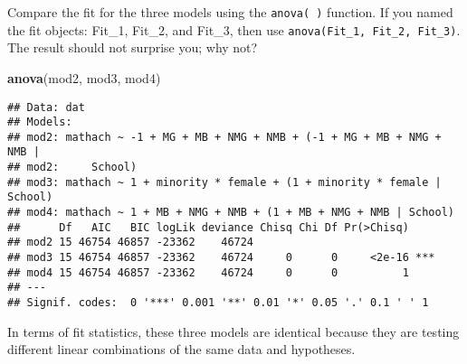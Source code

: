 \documentclass[]{article}
\newenvironment{Shaded}{\begin{snugshade}}{\end{snugshade}}
\newcommand{\KeywordTok}[1]{\textcolor[rgb]{0.13,0.29,0.53}{\textbf{#1}}}
\newcommand{\NormalTok}[1]{#1}
\begin{document}
Compare the fit for the three models using the \texttt{anova(\ )}
function. If you named the fit objects: Fit\_1, Fit\_2, and Fit\_3, then
use \texttt{anova(Fit\_1,\ Fit\_2,\ Fit\_3)}. The result should not
surprise you; why not?

\begin{Shaded}
\begin{Highlighting}[]
\KeywordTok{anova}\NormalTok{(mod2, mod3, mod4)}
\end{Highlighting}
\end{Shaded}

\begin{verbatim}
## Data: dat
## Models:
## mod2: mathach ~ -1 + MG + MB + NMG + NMB + (-1 + MG + MB + NMG + NMB | 
## mod2:     School)
## mod3: mathach ~ 1 + minority * female + (1 + minority * female | School)
## mod4: mathach ~ 1 + MB + NMG + NMB + (1 + MB + NMG + NMB | School)
##      Df   AIC   BIC logLik deviance Chisq Chi Df Pr(>Chisq)    
## mod2 15 46754 46857 -23362    46724                            
## mod3 15 46754 46857 -23362    46724     0      0     <2e-16 ***
## mod4 15 46754 46857 -23362    46724     0      0          1    
## ---
## Signif. codes:  0 '***' 0.001 '**' 0.01 '*' 0.05 '.' 0.1 ' ' 1
\end{verbatim}

In terms of fit statistics, these three models are identical because
they are testing different linear combinations of the same data and
hypotheses.
\end{document}
